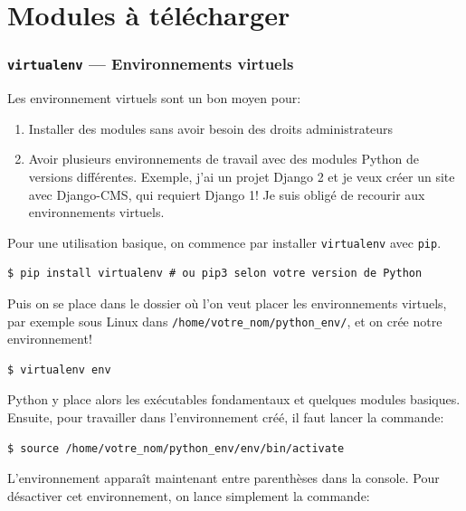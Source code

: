 \documentclass[a4paper, 10pt]{article}
\begin{document}
\part{Modules à télécharger}
\section[{\footnotesize\texttt{virtualenv}} --- Environnements virtuels]{{\normalfont\large\bfseries\texttt{virtualenv}} --- Environnements virtuels}\label{virtualenv}

Les environnement virtuels  sont un bon moyen pour:
\begin{enumerate}
    \item Installer des modules sans avoir besoin des droits administrateurs
    \item Avoir plusieurs environnements de travail avec des modules Python de versions différentes. Exemple, j'ai un projet Django 2 et je veux créer un site avec Django-CMS, qui requiert Django 1! Je suis obligé de recourir aux environnements virtuels.
\end{enumerate}

Pour une utilisation basique, on commence par installer \texttt{virtualenv} avec \texttt{pip}.

\begin{verbatim}
$ pip install virtualenv # ou pip3 selon votre version de Python
\end{verbatim}

Puis on se place dans le dossier où l'on veut placer les environnements virtuels, par exemple sous Linux dans \texttt{/home/votre_nom/python_env/}, et on crée notre environnement!

\begin{verbatim}
$ virtualenv env
\end{verbatim}

Python y place alors les exécutables fondamentaux et quelques modules basiques. Ensuite, pour travailler dans l'environnement créé, il faut lancer la commande:
\begin{verbatim}
$ source /home/votre_nom/python_env/env/bin/activate
\end{verbatim}

L'environnement apparaît maintenant entre parenthèses dans la console. Pour désactiver cet environnement, on lance simplement la commande:
\end{document}
